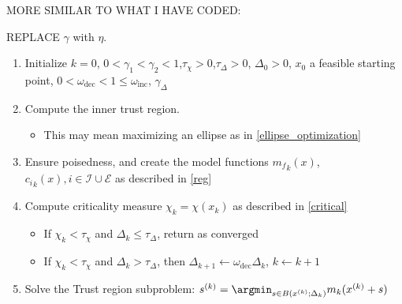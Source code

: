 



%
%



\noindent\makebox[\linewidth]{\rule{\paperwidth}{0.4pt}}

MORE SIMILAR TO WHAT I HAVE CODED:

REPLACE $\gamma$ with $\eta$.
\begin{enumerate}
    \item Initialize $k=0$, $0<\gamma_1<\gamma_2<1$,$\tau_{\chi}>0$,$\tau_{\Delta}>0$, $\Delta_0 > 0$, $x_0$ a feasible starting point, $0<\omega_{\text{dec}} < 1 \le \omega_{\text{inc}}$, $\gamma_{\Delta}$
    \item Compute the inner trust region.
    \begin{itemize}
        \item This may mean maximizing an ellipse as in \ref{ellipse_optimization}
    \end{itemize}
	\item Ensure poisedness, and create the model functions ${m_f}_k(x)$, ${c_i}_k(x), i \in \mathcal I \cup \mathcal E$ as described in \ref{reg}
	\item Compute criticality measure $\chi_k = \chi(x_k)$ as described in \ref{critical}
    \begin{itemize}
        \item If $\chi_k < \tau_{\chi}$ and $\Delta_k \le \tau_{\Delta}$, return as converged
        \item If $\chi_k < \tau_{\chi}$ and $\Delta_k > \tau_{\Delta}$, then $\Delta_{k+1} \leftarrow \omega_{\text{dec}} \Delta_k$, $k \leftarrow k + 1$
    \end{itemize}
	
	\item Solve the Trust region subproblem: $s^{(k)} = \argmin_{s\in B(x^{(k)};\Delta_k)} m_k(x^{(k)} + s)$
	

\end{enumerate}
